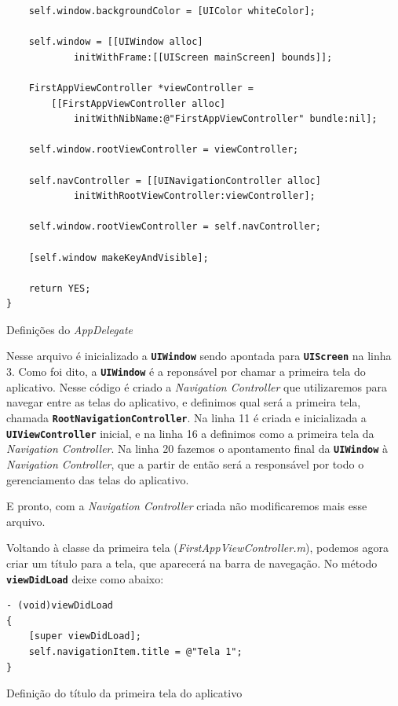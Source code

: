 \documentclass[a4paper,12pt,brazil,doubleside]{book}
\begin{document}
\begin{singlespace}
\begin{listing}[H]
\begin{verbatim}
    self.window.backgroundColor = [UIColor whiteColor];
    
    self.window = [[UIWindow alloc] 
    		initWithFrame:[[UIScreen mainScreen] bounds]];
    
    FirstAppViewController *viewController =
    	[[FirstAppViewController alloc] 
    		initWithNibName:@"FirstAppViewController" bundle:nil];
    
    self.window.rootViewController = viewController;

    self.navController = [[UINavigationController alloc] 
    		initWithRootViewController:viewController];
    
    self.window.rootViewController = self.navController;
    
    [self.window makeKeyAndVisible];
    
    return YES;
}
\end{verbatim}
\caption{Definições do \emph{AppDelegate}}
\end{listing}


Nesse arquivo é inicializado a \texttt{\textbf{UIWindow}} sendo apontada para \texttt{\textbf{UIScreen}} na linha 3. Como foi dito, a \texttt{\textbf{UIWindow}} é a reponsável por chamar a primeira tela do aplicativo. Nesse código é criado a \emph{Navigation Controller} que utilizaremos para navegar entre as telas do aplicativo, e definimos qual será a primeira tela, chamada \texttt{\textbf{RootNavigationController}}. Na linha 11 é criada e inicializada a \texttt{\textbf{UIViewController}} inicial, e na linha 16 a definimos como a primeira tela da \emph{Navigation Controller}. Na linha 20 fazemos o apontamento final da \texttt{\textbf{UIWindow}} à \emph{Navigation Controller}, que a partir de então será a responsável por todo o gerenciamento das telas do aplicativo.

E pronto, com a \emph{Navigation Controller} criada não modificaremos mais esse arquivo.

\bigskip


Voltando à classe da primeira tela (\emph{FirstAppViewController.m}), podemos agora criar um título para a tela, que aparecerá na barra de navegação. No método \texttt{\textbf{viewDidLoad}} deixe como abaixo:

\begin{listing}[H]
\begin{verbatim}
- (void)viewDidLoad
{
    [super viewDidLoad];
    self.navigationItem.title = @"Tela 1";
}
\end{verbatim}
\caption{Definição do título da primeira tela do aplicativo}
\end{listing}



\end{singlespace}
\end{document}
